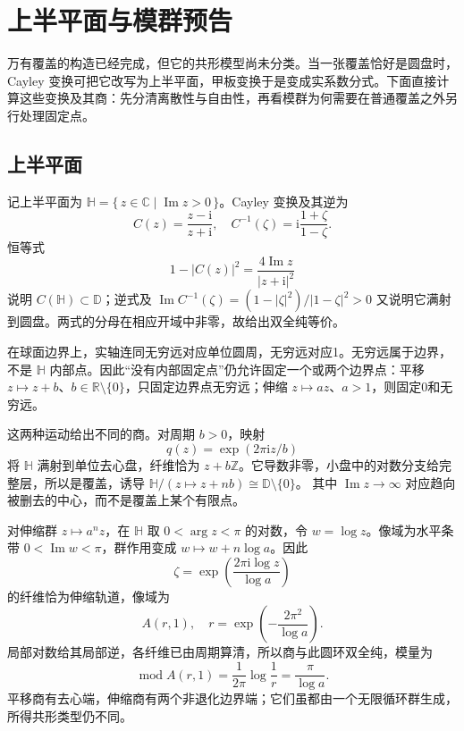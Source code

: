 \section{上半平面与模群预告}
\label{b3:sec:1104}

万有覆盖的构造已经完成，但它的共形模型尚未分类。当一张覆盖恰好是圆盘时，Cayley 变换可把它改写为上半平面，甲板变换于是变成实系数分式。下面直接计算这些变换及其商：先分清离散性与自由性，再看模群为何需要在普通覆盖之外另行处理固定点。

\subsection{上半平面}
\label{b3:subsec:110401}

记上半平面为 \(\mathbb H=\{\,z\in\mathbb C\mid\operatorname{Im}z>0\,\}\)。Cayley 变换及其逆为
\[
 C(z)=\frac{z-\mathrm{i}}{z+\mathrm{i}},\quad
 C^{-1}(\zeta)=\mathrm{i}\frac{1+\zeta}{1-\zeta}.
\]
恒等式
\[
 1-|C(z)|^2=\frac{4\operatorname{Im}z}{|z+\mathrm{i}|^2}
\]
说明 \(C(\mathbb H)\subset\mathbb D\)；逆式及
\(\operatorname{Im}C^{-1}(\zeta)=(1-|\zeta|^2)/|1-\zeta|^2>0\)
又说明它满射到圆盘。两式的分母在相应开域中非零，故给出双全纯等价。

\ProseParagraphBreak
在球面边界上，实轴连同无穷远对应单位圆周，无穷远对应1。无穷远属于边界，不是 \(\mathbb H\) 内部点。因此“没有内部固定点”仍允许固定一个或两个边界点：平移 \(z\mapsto z+b\)、\(b\in\mathbb R\setminus\{0\}\)，只固定边界点无穷远；伸缩 \(z\mapsto az\)、\(a>1\)，则固定0和无穷远。

\ProseParagraphBreak
这两种运动给出不同的商。对周期 \(b>0\)，映射
\[
 q(z)=\exp(2\pi\mathrm{i}z/b)
\]
将 \(\mathbb H\) 满射到单位去心盘，纤维恰为 \(z+b\mathbb Z\)。它导数非零，小盘中的对数分支给完整层，所以是覆盖，诱导
\(\mathbb H/(z\mapsto z+nb)\cong\mathbb D\setminus\{0\}\)。
其中 \(\operatorname{Im}z\to\infty\) 对应趋向被删去的中心，而不是覆盖上某个有限点。

\ProseParagraphBreak
对伸缩群 \(z\mapsto a^n z\)，在 \(\mathbb H\) 取 \(0<\arg z<\pi\) 的对数，令 \(w=\log z\)。像域为水平条带 \(0<\operatorname{Im}w<\pi\)，群作用变成 \(w\mapsto w+n\log a\)。因此
\[
 \zeta=\exp\left(\frac{2\pi\mathrm{i}\log z}{\log a}\right)
\]
的纤维恰为伸缩轨道，像域为
\[
 A(r,1),\quad r=\exp\left(-\frac{2\pi^2}{\log a}\right).
\]
局部对数给其局部逆，各纤维已由周期算清，所以商与此圆环双全纯，模量为
\[
 \operatorname{mod}A(r,1)=\frac1{2\pi}\log\frac1r
 =\frac{\pi}{\log a}.
\]
平移商有去心端，伸缩商有两个非退化边界端；它们虽都由一个无限循环群生成，所得共形类型仍不同。

